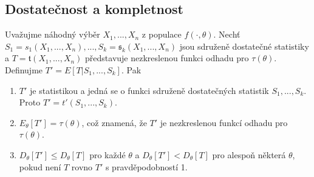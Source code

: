 \subsection{Dostatečnost a kompletnost}

\begin{theorem}
Uvažujme náhodný výběr $X_1, ..., X_n$ z populace $f(\cdot, \theta)$. Nechť $S_1 = {s_1}(X_1, ..., X_n), ..., S_k = \mathfrak{s}_k(X_1, ..., X_n)$ jsou sdruženě dostatečné statistiky a $T = \mathfrak{t}(X_1, ..., X_n)$ představuje nezkreslenou funkci odhadu pro $\tau(\theta)$. Definujme $T' = E[T|S_1, ..., S_k]$. Pak
\begin{enumerate}
\item $T'$ je statistikou a jedná se o funkci sdruženě dostatečných statistik $S_1, ..., S_k$. Proto $T' = \mathit{t'}(S_1, ..., S_k)$.
\item $E_{\theta}[T'] = \tau(\theta)$, což znamená, že $T'$ je nezkreslenou funkcí odhadu pro $\tau(\theta)$.
\item $D_{\theta}[T'] \le D_{\theta}[T]$ pro každé $\theta$ a  $D_{\theta}[T'] < D_{\theta}[T]$ pro alespoň některá $\theta$, pokud není $T$ rovno $T'$ s pravděpodobností 1.
\end{enumerate}
\end{theorem}

